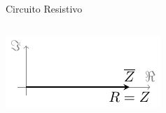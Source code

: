 \documentclass[xcolor={usenames,svgnames,dvipsnames}]{beamer}
\begin{document}
\begin{frame}[label={sec:org445d211}]{Circuito Resistivo}
\begin{columns}
\begin{column}{0.35\columnwidth}
\begin{center}
\includegraphics[width=.9\linewidth]{figs/fasorResistencia.pdf}
\end{center}
\end{column}
\end{columns}
\end{frame}
\end{document}

